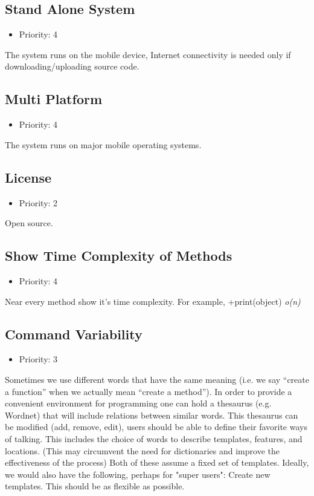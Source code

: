 \subsection{Stand Alone System}
\begin{itemize}
	\item Priority: 4
\end{itemize}
The system runs on the mobile device, Internet connectivity is needed only if downloading/uploading source code.
\subsection{Multi Platform}
\begin{itemize}
	\item Priority: 4
\end{itemize}
The system runs on major mobile operating systems.
\subsection{License}
\begin{itemize}
	\item Priority: 2
\end{itemize}
Open source.
\subsection{Show Time Complexity of Methods}
\begin{itemize}
	\item Priority: 4
\end{itemize}
Near every method show it's time complexity. For example, +print(object) \textit{o(n)}
\subsection{Command Variability}
\begin{itemize}
	\item Priority: 3
\end{itemize}
Sometimes we use different words that have the same meaning (i.e. we say “create a function” when we actually mean “create a method”). In order to provide a convenient environment for programming one can hold a thesaurus (e.g. Wordnet) that will include relations between similar words. This thesaurus can be modified (add, remove, edit), users should be able to define their favorite ways of talking.  This includes the choice of words to describe templates, features, and locations.  (This may circumvent the need for dictionaries and improve the effectiveness of the process) Both of these assume a fixed set of templates.  Ideally, we would also have the following, perhaps for "super users": Create new templates. This should be as flexible as possible.
